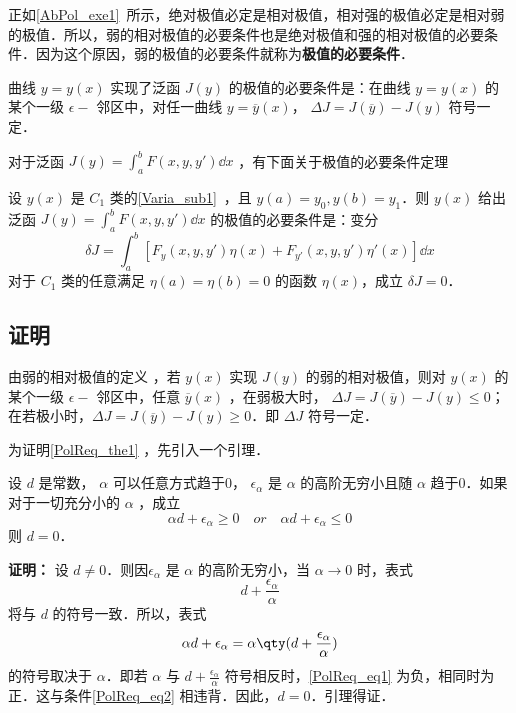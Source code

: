 
正如\autoref{AbPol_exe1}~所示，绝对极值必定是相对极值，相对强的极值必定是相对弱的极值．所以，弱的相对极值的必要条件也是绝对极值和强的相对极值的必要条件．因为这个原因，弱的极值的必要条件就称为\textbf{极值的必要条件}．

曲线 $y=y(x)$ 实现了泛函 $J(y)$ 的极值的必要条件是：在曲线 $y=y(x)$ 的某个一级 $\epsilon-$ 邻区中，对任一曲线 $y=\overline{y}(x)$， $\Delta J=J(\overline{y})-J(y)$ 符号一定．

对于泛函 $J(y)=\int_a^bF(x,y,y')\dd x$ ，有下面关于极值的必要条件定理
\begin{theorem}{}\label{PolReq_the1}
设 $y(x)$ 是 $C_1$ 类的\autoref{Varia_sub1}~，且 $y(a)=y_0,y(b)=y_1$．则 $y(x)$ 给出泛函 $J(y)=\int_a^bF(x,y,y')\dd x$ 的极值的必要条件是：变分
\begin{equation}
\delta J=\int_a^b[F_y(x,y,y')\eta(x)+F_{y'}(x,y,y')\eta'(x)]\dd x
\end{equation}
对于 $C_1$ 类的任意满足 $\eta(a)=\eta(b)=0$ 的函数 $\eta(x)$，成立 $\delta J=0$．
\end{theorem}
\subsection{证明}
由弱的相对极值的定义 ，若 $y(x)$ 实现 $J(y)$ 的弱的相对极值，则对 $y(x)$ 的某个一级 $\epsilon-$ 邻区中，任意 $\overline{y}(x)$ ，在弱极大时， $\Delta J=J(\overline{y})-J(y)\leq 0$；在若极小时，$\Delta J=J(\overline{y})-J(y)\geq 0$．即 $\Delta J$ 符号一定．

为证明\autoref{PolReq_the1} ，先引入一个引理．
\begin{lemma}{}\label{PolReq_lem1}
设 $d$ 是常数， $\alpha$ 可以任意方式趋于0， $\epsilon_\alpha$ 是 $\alpha$ 的高阶无穷小且随 $\alpha$ 趋于0．如果对于一切充分小的 $\alpha$ ，成立 
\begin{equation}\label{PolReq_eq2}
\alpha d+\epsilon_\alpha\geq0\quad or\quad\alpha d+\epsilon_\alpha\leq0
\end{equation}
则 $d=0$．
\end{lemma}
\textbf{证明：} 设 $d\neq 0$．则因$\epsilon_\alpha$ 是 $\alpha$ 的高阶无穷小，当 $\alpha\rightarrow0$ 时，表式
\begin{equation}
d+\frac{\epsilon_\alpha}{\alpha}
\end{equation}
 将与 $d$ 的符号一致．所以，表式
 \begin{equation}\label{PolReq_eq1}
 \alpha d+\epsilon_\alpha=\alpha\qty(d+\frac{\epsilon_\alpha}{\alpha})
 \end{equation}
 的符号取决于 $\alpha$．即若 $\alpha$ 与 $d+\frac{\epsilon_\alpha}{\alpha}$ 符号相反时，\autoref{PolReq_eq1} 为负，相同时为正．这与条件\autoref{PolReq_eq2} 相违背．因此，$d=0$．引理得证．
